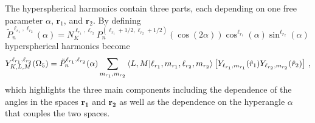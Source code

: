 The hyperspherical harmonics contain three parts, each depending on one free parameter $\alpha$, $\mathbf{r}_1$, and $\mathbf{r}_2$. By defining 
\begin{equation}
    \tilde{P}^{\ell_{r_1},\ell_{r_2}}_{n}(\alpha) = N^{\ell_{r_1},\ell_{r_2}}_K P_n^{(\ell_{r_1}+1/2,\ell_{r_2}+1/2)}(\cos(2\alpha)) \cos^{\ell_{r_1}}(\alpha) \sin^{\ell_{r_2}}(\alpha) 
\end{equation}
hyperspherical harmonics become
\begin{equation}
    Y^{\ell_{r_1},\ell_{r_2}}_{K,L,M}(\Omega_{5}) =\tilde{P}^{\ell_{r_1},\ell_{r_2}}_{n}(\alpha)\sum_{m_{r_1},m_{r_2}}\bra{L,M}\ket{\ell_{r_1},m_{r_1},\ell_{r_2},m_{r_2}}  \left[Y_{\ell_{r_1},m_{r_1}}(\hat{r}_1) Y_{\ell_{r_2},m_{r_2}}(\hat{r}_2)\right]\, ,
    \label{eq:hyperspherical_harm_simple}
\end{equation}
which highlights the three main components including the dependence of the angles in the spaces $\mathbf{r_1}$ and $\mathbf{r_2}$ as well as the dependence on the hyperangle $\alpha$ that couples the two spaces.
 
